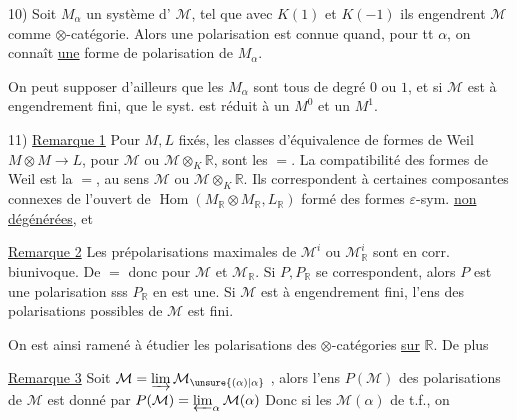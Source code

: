 
10) Soit $M_\alpha$ un système d'   $\mathcal M$, tel que avec $K(1)$ et $K(-1)$ ils engendrent $\mathcal M$ comme $\otimes$-catégorie. Alors une polarisation est connue quand, pour tt $\alpha$, on connaît \uline{une} forme de polarisation \inserted{$\varphi_\alpha$} de $M_\alpha$.

On peut supposer d'ailleurs que les $M_\alpha$ sont tous de degré $0$ ou $1$, et si $\mathcal M$ est à engendrement fini, que le syst. est réduit à un $M^0$ et un $M^1$. 

11) \uline{Remarque 1}  Pour $M,L$ fixés, les classes d'équivalence de formes de Weil  $M\otimes M\to L$,  pour $\mathcal M$ ou $\mathcal M\otimes_K\mathbb R$, sont les $=$. La compatibilité des formes de Weil est la $=$, au sens  $\mathcal M$ ou $\mathcal M\otimes_K\mathbb R$. Ils correspondent à certaines composantes connexes de l'ouvert de $\operatorname{Hom}(M_{\mathbb R}\otimes M_{\mathbb R},L_{\mathbb R})$ formé des formes $\varepsilon$-sym. \uline{non dégénérées}, et 

\uline{Remarque 2} Les prépolarisations maximales de $\mathcal M^i$ ou $\mathcal M_{\mathbb R}^i$ sont en corr. biunivoque. De $=$ donc pour $\mathcal M$ et $\mathcal M_{\mathbb R}$. Si $P,P_{\mathbb R}$ se correspondent, alors $P$ est une polarisation sss $P_{\mathbb R}$ en est une. Si $\mathcal M$ est à engendrement fini,  l'ens des polarisations possibles de $\mathcal M$ est fini.

On est ainsi ramené à étudier les polarisations des $\otimes$-catégories \uline{sur} $\mathbb R$. De plus

\uline{Remarque 3} Soit $\mathcal M=\varinjlim\mathcal M_{\unsure{(\alpha)|\alpha}}$ , alors l'ens $P(\mathcal M)$ des polarisations de $\mathcal M$ est donné par $P(\mathcal M)=\varprojlim_\alpha\mathcal M(\alpha)$  Donc si les $\mathcal M(\alpha)$  de t.f., on

